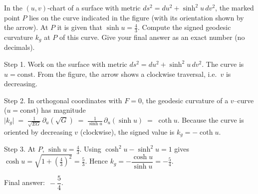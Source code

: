 In the $(u,v)$-chart of a surface with metric $ds^{2} = du^{2} + \sinh^{2}u\,dv^{2}$, the marked point $P$ lies on the curve indicated in the figure (with its orientation shown by the arrow). At $P$ it is given that $\sinh u = \tfrac{4}{3}$. Compute the signed geodesic curvature $k_g$ at $P$ of this curve. Give your final answer as an exact number (no decimals).


Step 1. Work on the surface with metric $ds^{2}=du^{2}+\sinh^{2}u\,dv^{2}$.  
The curve is $u=\text{const}$. From the figure, the arrow shows a clockwise traversal, i.e.\ $v$ is decreasing.

Step 2. In orthogonal coordinates with $F=0$, the geodesic curvature of a $v$–curve ($u=\text{const}$) has magnitude  
$\lvert k_g\rvert \;=\;\tfrac{1}{\sqrt{EG}}\,\partial_u(\sqrt{G}) \;=\;\tfrac{1}{\sinh u}\,\partial_u(\sinh u)\;=\;\coth u$.  
Because the curve is oriented by decreasing $v$ (clockwise), the signed value is $k_g=-\coth u$.

Step 3. At $P$, $\sinh u=\tfrac{4}{3}$. Using $\cosh^{2}u-\sinh^{2}u=1$ gives  
$\cosh u=\sqrt{1+\left(\tfrac{4}{3}\right)^{2}}=\tfrac{5}{3}$. Hence  
$k_g=-\dfrac{\cosh u}{\sinh u}=-\tfrac{5}{4}$.

Final answer: $\,-\dfrac{5}{4}$.